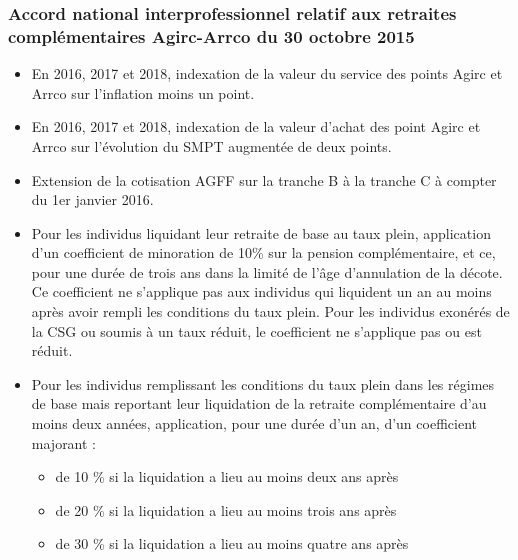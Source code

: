 \subsubsection{Accord national interprofessionnel relatif aux retraites complémentaires Agirc-Arrco du 30 octobre 2015}
\begin{itemize}
   \item En 2016, 2017 et 2018, indexation de la valeur du service des points Agirc et Arrco sur l'inflation moins un point.
   \item En 2016, 2017 et 2018, indexation de la valeur d'achat des point Agirc et Arrco sur l'évolution du SMPT augmentée de deux points.
   \item Extension de la cotisation AGFF sur la tranche B à la tranche C à compter du 1er janvier 2016.
   \item Pour les individus liquidant leur retraite de base au taux plein, application d'un coefficient de minoration de 10\% sur la pension complémentaire, et ce, pour une durée de trois ans dans la limité de l'âge d'annulation de la décote. Ce coefficient ne s'applique pas aux individus qui liquident un an au moins après avoir rempli les conditions du taux plein. Pour les individus exonérés de la CSG ou soumis à un taux réduit, le coefficient ne s'applique pas ou est réduit.
   \item Pour les individus remplissant les conditions du taux plein dans les régimes de base mais reportant leur liquidation de la retraite complémentaire d'au moins deux années, application, pour une durée d'un an, d'un coefficient majorant :
   \begin{itemize}
   \item de 10 \% si la liquidation a lieu au moins deux ans après
   \item de 20 \% si la liquidation a lieu au moins trois ans après
   \item de 30 \% si la liquidation a lieu au moins quatre ans après
   \end{itemize}
\end{itemize}




